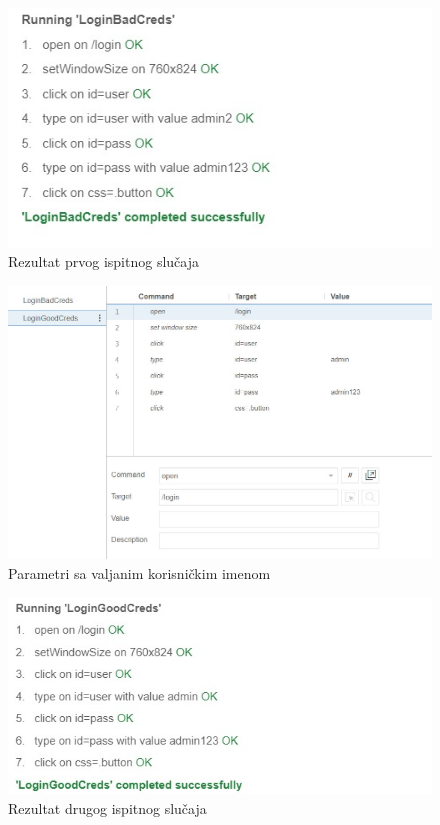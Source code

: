 			 \begin{figure}[H]
			 	\centering
			 	\includegraphics[width=\textwidth]{slike/krivi2.JPEG}
			 	\caption{Rezultat prvog ispitnog slučaja}
			 	\label{fig:dijagram_baze}
			 \end{figure}
			 
			 \begin{figure}[H]
			 	\centering
			 	\includegraphics[width=\textwidth]{slike/pravi.JPEG}
			 	\caption{Parametri sa valjanim korisničkim imenom}
			 	\label{fig:dijagram_baze}
			 \end{figure}
		
			  \begin{figure}[H]
			 	\centering
			 	\includegraphics[width=\textwidth]{slike/pravi2.JPEG}
			 	\caption{Rezultat drugog ispitnog slučaja}
			 	\label{fig:dijagram_baze}
			 \end{figure}
			 
